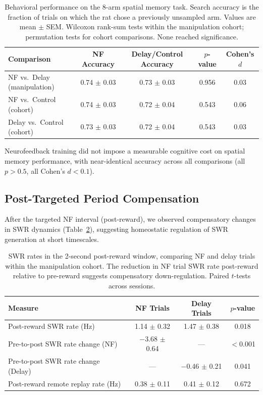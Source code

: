 \documentclass[11pt]{article}
\begin{document}
\begin{table}[H]
\centering
\caption{Behavioral performance on the 8-arm spatial memory task. Search accuracy is the fraction of trials on which the rat chose a previously unsampled arm. Values are mean $\pm$ SEM. Wilcoxon rank-sum tests within the manipulation cohort; permutation tests for cohort comparisons. None reached significance.}
\label{tab:behavior}
\begin{tabular}{lcccc}
\toprule
\textbf{Comparison} & \textbf{NF Accuracy} & \textbf{Delay/Control Accuracy} & \textbf{$p$-value} & \textbf{Cohen's $d$} \\
\midrule
NF vs.\ Delay (manipulation) & 0.74 $\pm$ 0.03 & 0.73 $\pm$ 0.03 & 0.956 & 0.03 \\
NF vs.\ Control (cohort) & 0.74 $\pm$ 0.03 & 0.72 $\pm$ 0.04 & 0.543 & 0.06 \\
Delay vs.\ Control (cohort) & 0.73 $\pm$ 0.03 & 0.72 $\pm$ 0.04 & 0.543 & 0.03 \\
\bottomrule
\end{tabular}
\end{table}

Neurofeedback training did not impose a measurable cognitive cost on spatial memory performance, with near-identical accuracy across all comparisons (all $p > 0.5$, all Cohen's $d < 0.1$).

\subsection{Post-Targeted Period Compensation}

After the targeted NF interval (post-reward), we observed compensatory changes in SWR dynamics (Table~\ref{tab:compensation}), suggesting homeostatic regulation of SWR generation at short timescales.

\begin{table}[H]
\centering
\caption{SWR rates in the 2-second post-reward window, comparing NF and delay trials within the manipulation cohort. The reduction in NF trial SWR rate post-reward relative to pre-reward suggests compensatory down-regulation. Paired $t$-tests across sessions.}
\label{tab:compensation}
\begin{tabular}{lccc}
\toprule
\textbf{Measure} & \textbf{NF Trials} & \textbf{Delay Trials} & \textbf{$p$-value} \\
\midrule
Post-reward SWR rate (Hz) & 1.14 $\pm$ 0.32 & 1.47 $\pm$ 0.38 & 0.018 \\
Pre-to-post SWR rate change (NF) & $-$3.68 $\pm$ 0.64 & --- & $<$0.001 \\
Pre-to-post SWR rate change (Delay) & --- & $-$0.46 $\pm$ 0.21 & 0.041 \\
Post-reward remote replay rate (Hz) & 0.38 $\pm$ 0.11 & 0.41 $\pm$ 0.12 & 0.672 \\
\bottomrule
\end{tabular}
\end{table}
\end{document}
